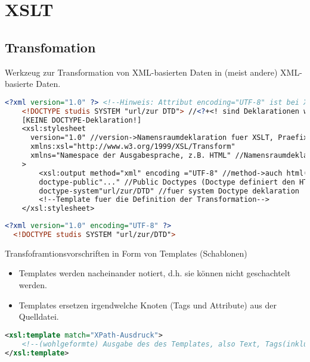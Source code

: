 \chapter{XSLT}

\section{Transfomation}
Werkzeug zur Transformation von XML-basierten Daten in (meist andere) XML-basierte Daten.
\begin{lstlisting}[caption={Definition einer XML-Datei zur Transformation}, label={lst:inline-dtd}, language={XML}]
	<?xml version="1.0" ?> <!--Hinweis: Attribut encoding="UTF-8" ist bei XML default-->
	<!DOCTYPE studis SYSTEM "url/zur DTD"> //<?+<! sind Deklarationen wobei <! auf > endet.
	[KEINE DOCTYPE-Deklaration!]
	<xsl:stylesheet	
	  version="1.0" //version->Namensraumdeklaration fuer XSLT, Praefix->Postfix
	  xmlns:xsl="http://www.w3.org/1999/XSL/Transform"
	  xmlns="Namespace der Ausgabesprache, z.B. HTML" //Namensraumdeklaration fuer Ausgabesprache, Verwendung ohne Postfix und Praefix (Grund: Ersparung von Schreibarbeit)
	>
		<xsl:output method="xml" encoding ="UTF-8" //method->auch html( bitte nicht angeben!) oder text
		doctype-public"..." //Public Doctypes (Doctype definiert den HTML-Standart)
		doctype-system"url/zur/DTD" //fuer system Doctype deklaration 
		<!--Template fuer die Definition der Transformation-->
	</xsl:stylesheet>
\end{lstlisting}

\newpage
\begin{lstlisting}[caption={Transformierte XML-Datei}, label={lst:generierte-xml}, language={XML}]
  <?xml version="1.0" encoding="UTF-8" ?>
  <!DOCTYPE studis SYSTEM "url/zur/DTD">
\end{lstlisting}


Transfoframtionsvorschriften in Form von Templates (Schablonen)
\begin{itemize}
\item Templates werden nacheinander notiert, d.h. sie können nicht geschachtelt werden.
\item Templates ersetzen irgendwelche Knoten (Tags und Attribute) aus der Quelldatei.
\end{itemize}

\begin{lstlisting}[caption={Syntax einer xsl:template-Deklaration}, label={lst:xsl-template}, language={XML}]
<xsl:template match="XPath-Ausdruck">
	<!--(wohlgeformte) Ausgabe des des Templates, also Text, Tags(inklusive Attribute) und 	weitere Verarbeitungsanweisungen-->
</xsl:template>
\end{lstlisting}